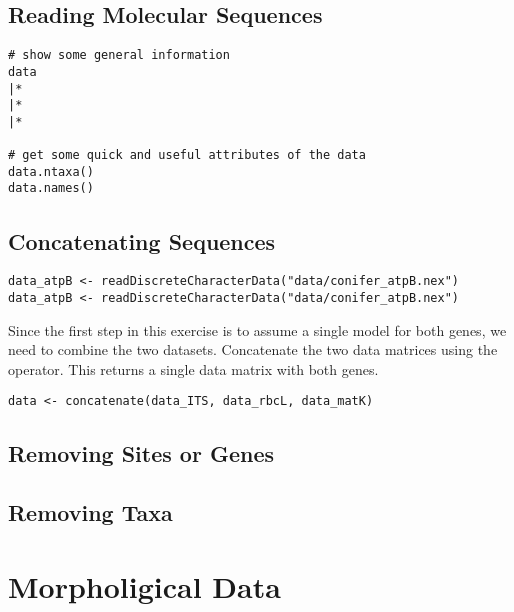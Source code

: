 \subsection{Reading Molecular Sequences}


{\tt \begin{snugshade*}
\begin{lstlisting}
# show some general information
data
|*
|*
|*

# get some quick and useful attributes of the data
data.ntaxa()
data.names()	
\end{lstlisting}
\end{snugshade*}}



\subsection{Concatenating Sequences}


{\tt \begin{snugshade*}
\begin{lstlisting}
data_atpB <- readDiscreteCharacterData("data/conifer_atpB.nex")
data_atpB <- readDiscreteCharacterData("data/conifer_atpB.nex")
\end{lstlisting}
\end{snugshade*}}

Since the first step in this exercise is to assume a single model for both genes, we need to combine the two datasets.
Concatenate the two data matrices using the \cl{+} operator. This returns a single data matrix with both genes.

{\tt \begin{snugshade*}
\begin{lstlisting}
data <- concatenate(data_ITS, data_rbcL, data_matK)
\end{lstlisting}
\end{snugshade*}}



\subsection{Removing Sites or Genes}


\subsection{Removing Taxa}



\section{Morpholigical Data}



